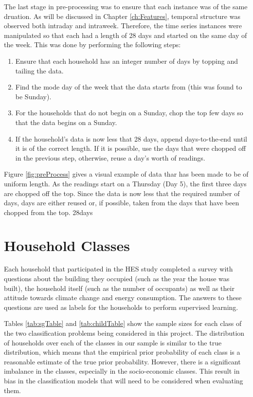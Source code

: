 The last stage in pre-processing was to ensure that each instance was of the same druation. As will be discussed in Chapter \ref{ch:Features}, temporal structure was observed both intraday and intraweek. Therefore, the time series instances were manipulated so that each had a length of 28 days and started on the same day of the week. This was done by performing the following steps:

\begin{enumerate}
\item Ensure that each household has an integer number of days by topping and tailing the data.
\item Find the mode day of the week that the data starts from (this was found to be Sunday).
\item For the households that do not begin on a Sunday, chop the top few days so that the data begins on a Sunday.
\item If the household's data is now less that 28 days, append days-to-the-end until it is of the correct length. If it is possible, use the days that were chopped off in the previous step, otherwise, reuse a day's worth of readings.
\end{enumerate}

Figure \ref{fig:preProcess} gives a visual example of data thar has been made to be of uniform length. As the readings start on a Thursday (Day 5), the first three days are chopped off the top. Since the data is now less that the required number of days, days are either reused or, if possible, taken from the days that have been chopped from the top.
\to28days

\section{Household Classes}

Each household that participated in the HES study completed a survey with questions about the building  they occupied (such as the year the house was built), the household itself (such as the number of occupants) as well as their attitude towards climate change and energy consumption. The answers to these questions are used as labels for the households to perform supervised learning.

\sgTable

Tables \ref{tab:sgTable} and \ref{tab:childTable} show the sample sizes for each class of the two classification problems being considered in this project. The distribution of households over each of the classes in our sample is similar to the true distribution, which means that the empirical prior probability of each class is a reasonable estimate of the true prior probability. However, there is a significant imbalance in the classes, especially in the socio-economic classes. This result in bias in the classification models that will need to be considered when evaluating them.
\childTable

